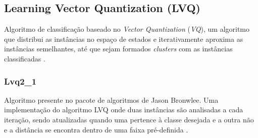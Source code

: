 \subsection{Learning Vector Quantization (LVQ)}

Algoritmo de classificação baseado no \emph{Vector Quantization} (\emph{VQ}), um algoritmo que distribui as instâncias no espaço de estados e iterativamente aproxima as instâncias semelhantes, até que sejam formados \emph{clusters} com as instâncias classificadas \cite{Kohonen1997}.

\subsubsection{Lvq2\_1}

Algoritmo presente no pacote de algoritmos de Jason Bronwlee. Uma implementação do algoritmo LVQ onde duas instâncias são analisadas a cada iteração, sendo atualizadas quando uma pertence à classe desejada e a outra não e a distância se encontra dentro de uma faixa pré-definida \cite{Brownlee2011w}.

